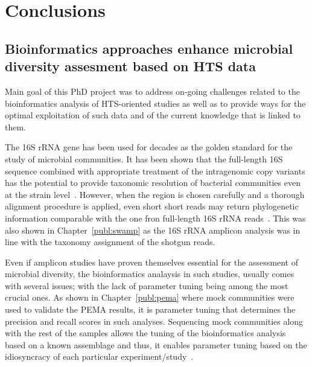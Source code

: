 % 
% 

\chapter{Conclusions}
\label{cha:conclusion}

\section{Bioinformatics approaches enhance microbial diversity assesment based on HTS data}
\label{concl:diversity}

   Main goal of this PhD project was to address on-going challenges 
   related to the bioinformatics analysis of HTS-oriented studies 
   as well as 
   to provide ways for the optimal exploitation of such data and of 
   the current knowledge that is linked to them. 

   The 16S rRNA gene has been used for decades as the golden standard for the 
   study of microbial communities. 
   It has been shown that the
   full-length 16S sequence
   combined with appropriate treatment of the 
   intragenomic copy variants 
   has the potential to provide taxonomic resolution of 
   bacterial communities even at the strain level~\citep{johnson_evaluation_2019}.
   However, when the region is chosen carefully 
   and a thorough alignment procedure is applied,
   even short short reads may return phylogenetic information 
   comparable with the one fron full-length 16S rRNA reads~\citep{jeraldo2011suitability}.
   This was also shown in Chapter~\ref{publ:swamp} as the 16S rRNA amplicon analysis 
   was in line with the taxonomy assignment of the shotgun reads. 

   Even if amplicon studies have proven themselves essential for the assessment of 
   microbial diversity, the bioinformatics analaysis in such studies, 
   usually comes with several issues; 
   with the lack of parameter tuning being among the most crucial ones. 
   As shown in Chapter~\ref{publ:pema} where mock communities were used to validate the PEMA results,
   it is parameter tuning that determines the 
   precision and recall scores in such analyses. 
   Sequencing mock communities along with the rest of the samples   
   allows the tuning of the bioinformatics analysis based on a known assemblage
   and thus, it enables parameter tuning based on the idiosyncracy of each particular experiment/study~\citep{bokulich2020measuring}.

